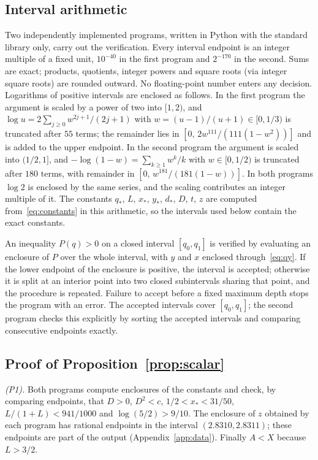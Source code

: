 \documentclass{amsart}
\numberwithin{equation}{section}
\numberwithin{table}{section}
\theoremstyle{definition}
\theoremstyle{remark}
\newcommand{\qs}{q_{\ast}}
\newcommand{\xs}{x_{\ast}}
\newcommand{\ys}{y_{\ast}}
\newcommand{\ds}{d_{\ast}}
\begin{document}
\subsection{Interval arithmetic}
Two independently implemented programs, written in Python with the standard library only, carry out the verification. Every interval endpoint is an integer multiple of a fixed unit, $10^{-40}$ in the first program and $2^{-170}$ in the second. Sums are exact; products, quotients, integer powers and square roots (via integer square roots) are rounded outward. No floating-point number enters any decision. Logarithms of positive intervals are enclosed as follows. In the first program the argument is scaled by a power of two into $[1,2)$, and $\log u=2\sum_{j\ge0}w^{2j+1}/(2j+1)$ with $w=(u-1)/(u+1)\in[0,1/3)$ is truncated after $55$ terms; the remainder lies in $[0,\,2w^{111}/(111(1-w^2))]$ and is added to the upper endpoint. In the second program the argument is scaled into $(1/2,1]$, and $-\log(1-w)=\sum_{k\ge1}w^k/k$ with $w\in[0,1/2)$ is truncated after $180$ terms, with remainder in $[0,\,w^{181}/(181(1-w))]$. In both programs $\log2$ is enclosed by the same series, and the scaling contributes an integer multiple of it. The constants $\qs$, $L$, $\xs$, $\ys$, $\ds$, $D$, $t$, $z$ are computed from~\eqref{eq:constants} in this arithmetic, so the intervals used below contain the exact constants.

An inequality $P(q)>0$ on a closed interval $[q_0,q_1]$ is verified by evaluating an enclosure of $P$ over the whole interval, with $y$ and $x$ enclosed through~\eqref{eq:qy}. If the lower endpoint of the enclosure is positive, the interval is accepted; otherwise it is split at an interior point into two closed subintervals sharing that point, and the procedure is repeated. Failure to accept before a fixed maximum depth stops the program with an error. The accepted intervals cover $[q_0,q_1]$; the second program checks this explicitly by sorting the accepted intervals and comparing consecutive endpoints exactly.

\subsection{Proof of Proposition~\ref{prop:scalar}}
\emph{(P1).} Both programs compute enclosures of the constants and check, by comparing endpoints, that $D>0$, $D^2<c$, $1/2<\xs<31/50$, $L/(1+L)<941/1000$ and $\log(5/2)>9/10$. The enclosure of $z$ obtained by each program has rational endpoints in the interval $(2.8310,2.8311)$; these endpoints are part of the output (Appendix~\ref{app:data}). Finally $A<X$ because $L>3/2$.
\end{document}
